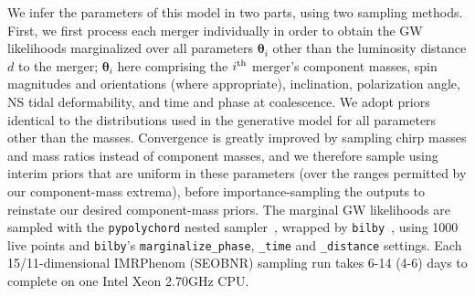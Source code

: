\documentclass[%
 reprint,
 superscriptaddress,
 nofootinbib,
 amsmath,amssymb,
 aps,
]{revtex4-2}
\newcommand{\hubble}{\ensuremath{H_0}}
\newcommand{\decel}{\ensuremath{q_0}}
\newcommand{\jerk}{\ensuremath{j_0}}
\newcommand{\prob}{\ensuremath{{\rm P}}}
\newcommand{\dgw}{\hat{\bm{x}}}
\begin{document}
We infer the parameters of this model in two parts, using two sampling methods. First, we first process each merger individually in order to obtain the GW likelihoods marginalized over all parameters $\boldsymbol{\theta}_i$ other than the luminosity distance $d$ to the merger;
$\boldsymbol{\theta}_i$ here comprising the $i^{\rm th}$ merger's component masses, spin magnitudes and orientations (where appropriate), inclination, polarization angle, NS tidal deformability, and time and phase at coalescence. We adopt priors identical to the distributions used in the generative model for all parameters other than the masses. Convergence is greatly improved by sampling chirp masses and mass ratios instead of component masses, and we therefore sample using interim priors that are uniform in these parameters (over the ranges permitted by our component-mass extrema), before importance-sampling the outputs to reinstate our desired component-mass priors. The marginal GW likelihoods are sampled with the \texttt{pypolychord} nested sampler~\cite{Handley_etal:2015a,Handley_etal:2015b}, wrapped by \texttt{bilby}~\cite{Ashton_etal:2019}, using 1000 live points and \texttt{bilby}'s \texttt{marginalize\_phase}, \texttt{\_time} and \texttt{\_distance} settings. Each 15/11-dimensional IMRPhenom (SEOBNR) sampling run takes 6-14 (4-6) days to complete on one Intel Xeon 2.70GHz CPU.
\end{document}
